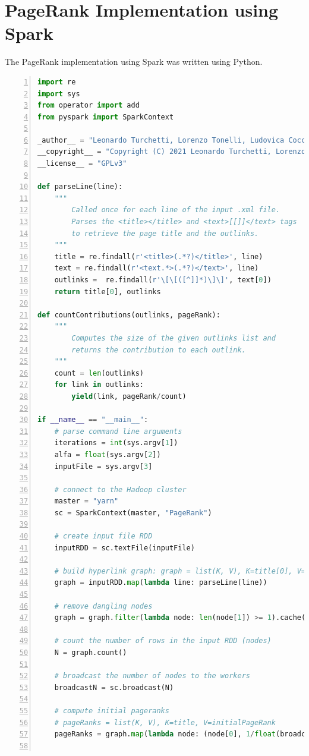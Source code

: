 \documentclass[11pt,a4paper]{article}
\begin{document}
\section{PageRank Implementation using Spark}
The PageRank implementation using Spark was written using Python.
\begin{lstlisting}[language=python,numbers=left,basicstyle=\tiny]
import re
import sys
from operator import add
from pyspark import SparkContext

_author__ = "Leonardo Turchetti, Lorenzo Tonelli, Ludovica Cocchella and Rambod Rahmani"
__copyright__ = "Copyright (C) 2021 Leonardo Turchetti, Lorenzo Tunelli, Ludovica Cocchella and Rambod Rahmani"
__license__ = "GPLv3"

def parseLine(line):
    """
        Called once for each line of the input .xml file.
        Parses the <title></title> and <text>[[]]</text> tags
        to retrieve the page title and the outlinks.
    """
    title = re.findall(r'<title>(.*?)</title>', line)
    text = re.findall(r'<text.*>(.*?)</text>', line)
    outlinks =  re.findall(r'\[\[([^]]*)\]\]', text[0])
    return title[0], outlinks

def countContributions(outlinks, pageRank):
    """
        Computes the size of the given outlinks list and
        returns the contribution to each outlink.
    """
    count = len(outlinks)
    for link in outlinks:
        yield(link, pageRank/count)

if __name__ == "__main__":
    # parse command line arguments
    iterations = int(sys.argv[1])
    alfa = float(sys.argv[2])
    inputFile = sys.argv[3]

    # connect to the Hadoop cluster
    master = "yarn"
    sc = SparkContext(master, "PageRank")

    # create input file RDD
    inputRDD = sc.textFile(inputFile)

    # build hyperlink graph: graph = list(K, V), K=title[0], V=[outlinks]
    graph = inputRDD.map(lambda line: parseLine(line))

    # remove dangling nodes
    graph = graph.filter(lambda node: len(node[1]) >= 1).cache()

    # count the number of rows in the input RDD (nodes)
    N = graph.count()

    # broadcast the number of nodes to the workers
    broadcastN = sc.broadcast(N)

    # compute initial pageranks
    # pageRanks = list(K, V), K=title, V=initialPageRank
    pageRanks = graph.map(lambda node: (node[0], 1/float(broadcastN.value)))


\end{lstlisting}
\end{document}

